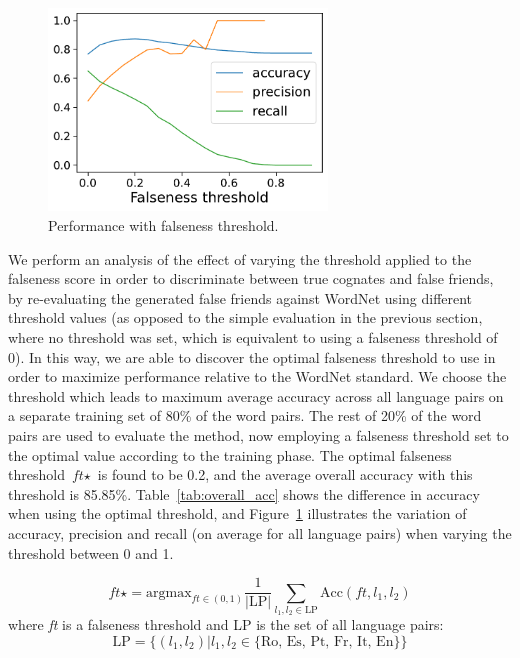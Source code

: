 \documentclass[output=paper]{langsci/langscibook}
\begin{document}
\begin{figure}
    \centering
    \includegraphics[width=0.66\textwidth]{figures/UBAN_falseness_vs_accuracy.pdf}
    \caption{Performance with falseness threshold.}
    \label{fig:false_vs_acc}
\end{figure}

We perform an analysis of the effect of varying the threshold applied to the falseness score in order to discriminate between true cognates and false friends, by re-evaluating the generated false friends against WordNet using different threshold values (as opposed to the simple evaluation in the previous section, where no threshold was set, which is equivalent to using a falseness threshold of 0). In this way, we are able to discover the optimal falseness threshold to use in order to maximize performance relative to the WordNet standard. We choose the threshold which leads to maximum average accuracy across all language pairs on a separate training set of 80\% of the word pairs. The rest of 20\% of the word pairs are used to evaluate the method, now employing a falseness threshold set to the optimal value according to the training phase. The optimal falseness threshold $\textit{ft}\star$ is found to be 0.2, and the average overall accuracy with this threshold is 85.85\%. Table~\ref{tab:overall_acc} shows the difference in accuracy when using the optimal threshold, and Figure~\ref{fig:false_vs_acc} illustrates the variation of accuracy, precision and recall (on average for all language pairs) when varying the threshold between 0 and 1.

\begin{equation}
\textit{ft}\star = \text{argmax}_{\textit{ft} \in (0,1)}\frac{1}{|\text{LP}|}\sum_{l_1,l_2 \in \text{LP}}{\text{Acc}(\textit{ft},l_1,l_2)}
\end{equation}
where \textit{ft} is a falseness threshold and LP is the set of all language pairs:
\begin{equation}
    \text{LP} = \{(l_1,l_2) | l_1, l_2 \in \{\text{Ro, Es, Pt, Fr, It, En}\}\}
\end{equation}
\end{document}
